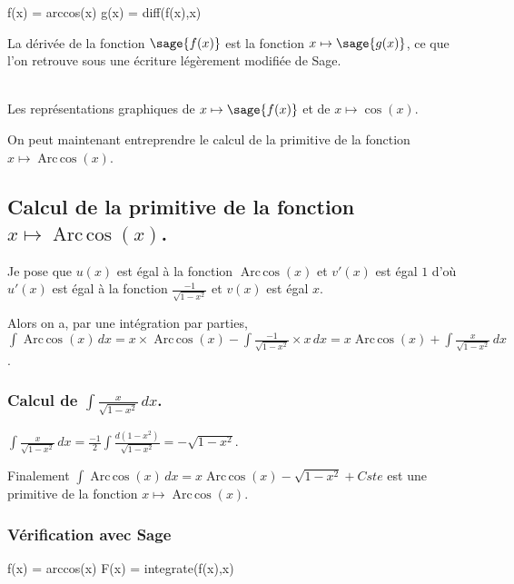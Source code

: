 \documentclass[a4paper,14pt]{extreport} %
\renewcommand{\arccos}{\mathop{\mathrm{Arc\,cos}}}
\begin{document}
\begin{sageblock}
    f(x) = arccos(x)
    g(x) = diff(f(x),x)
\end{sageblock}

La dérivée de la fonction $\sage{f(x)}$ est la fonction $x \mapsto \sage{g(x)} $, ce que l'on retrouve sous une écriture légèrement modifiée de Sage.


\begin{center}
\\
Les représentations graphiques de $x \mapsto \sage{f(x)} $ et de $x\mapsto \cos(x)$.
\end{center}

On peut maintenant entreprendre le calcul de la primitive de la  fonction  $x \mapsto \arccos(x) $.

\subsection{Calcul de la primitive de la fonction  $x \mapsto \arccos(x) $.}


Je pose que $u(x)$  est égal à la fonction $\arccos(x)$ et $v'(x)$ est égal $1$  d'où $u'(x)$  est égal à la fonction $ \frac{-1}{\sqrt{1- x^2}} $ et $v(x)$ est égal $x$.

Alors on a, par une intégration par parties, $\int \arccos(x) \, dx = x \times \arccos(x) -\int \frac{-1}{\sqrt{1- x^2}} \times x \, dx =  x \arccos(x) + \int \frac{x}{\sqrt{1- x^2}} \, dx $.


\subsubsection*{Calcul de $\int \frac{x}{\sqrt{1- x^2}} \, dx $.}

$\int \frac{x}{\sqrt{1- x^2}} \, dx = \frac{-1}{2} \int \frac{d(1-x^2)}{\sqrt{1- x^2}}= -\sqrt{1- x^2} $.


Finalement $\int \arccos(x) \, dx = x  \arccos(x) - \sqrt{1- x^2} + Cste $ est une primitive de la fonction $x \mapsto \arccos(x) $.

\subsubsection*{Vérification avec Sage}

\begin{sageblock}
    f(x) = arccos(x)
    F(x) = integrate(f(x),x)
\end{sageblock}
\end{document}
